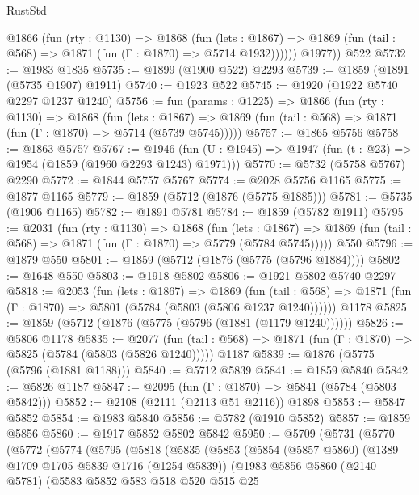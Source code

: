 \begin{lexlean}{RustStd}
\begin{coremodule}
          @1866
            (fun (rty : @1130) =>
            @1868
              (fun (lets : @1867) =>
              @1869 (fun (tail : @568) => @1871 (fun (Γ : @1870) => @5714 @1932))))))
        @1977))
    @522
@5732 := @1983 @1835
@5735 := @1899 (@1900 @522) @2293
@5739 := @1859 (@1891 (@5735 @1907) @1911)
@5740 := @1923 @522
@5745 := @1920 (@1922 @5740 @2297 @1237 @1240)
@5756 := fun (params : @1225) =>
  @1866
    (fun (rty : @1130) =>
    @1868
      (fun (lets : @1867) =>
      @1869 (fun (tail : @568) => @1871 (fun (Γ : @1870) => @5714 (@5739 @5745)))))
@5757 := @1865 @5756
@5758 := @1863 @5757
@5767 := @1946 (fun (U : @1945) => @1947 (fun (t : @23) => @1954 (@1859 (@1960 @2293 @1243) @1971)))
@5770 := @5732 (@5758 @5767) @2290
@5772 := @1844 @5757 @5767
@5774 := @2028 @5756 @1165
@5775 := @1877 @1165
@5779 := @1859 (@5712 (@1876 (@5775 @1885)))
@5781 := @5735 (@1906 @1165)
@5782 := @1891 @5781
@5784 := @1859 (@5782 @1911)
@5795 := @2031
    (fun (rty : @1130) =>
    @1868
      (fun (lets : @1867) =>
      @1869 (fun (tail : @568) => @1871 (fun (Γ : @1870) => @5779 (@5784 @5745)))))
    @550
@5796 := @1879 @550
@5801 := @1859 (@5712 (@1876 (@5775 (@5796 @1884))))
@5802 := @1648 @550
@5803 := @1918 @5802
@5806 := @1921 @5802 @5740 @2297
@5818 := @2053
    (fun (lets : @1867) =>
    @1869
      (fun (tail : @568) => @1871 (fun (Γ : @1870) => @5801 (@5784 (@5803 (@5806 @1237 @1240))))))
    @1178
@5825 := @1859 (@5712 (@1876 (@5775 (@5796 (@1881 (@1179 @1240))))))
@5826 := @5806 @1178
@5835 := @2077
    (fun (tail : @568) => @1871 (fun (Γ : @1870) => @5825 (@5784 (@5803 (@5826 @1240)))))
    @1187
@5839 := @1876 (@5775 (@5796 (@1881 @1188)))
@5840 := @5712 @5839
@5841 := @1859 @5840
@5842 := @5826 @1187
@5847 := @2095 (fun (Γ : @1870) => @5841 (@5784 (@5803 @5842)))
@5852 := @2108 (@2111 (@2113 @51 @2116)) @1898
@5853 := @5847 @5852
@5854 := @1983 @5840
@5856 := @5782 (@1910 @5852)
@5857 := @1859 @5856
@5860 := @1917 @5852 @5802 @5842
@5950 := @5709
    (@5731
      (@5770
        (@5772
          (@5774
            (@5795
              (@5818
                (@5835
                  (@5853
                    (@5854
                      (@5857 @5860)
                      (@1389 @1709 @1705 @5839 @1716 (@1254 @5839))
                      (@1983
                        @5856
                        @5860
                        (@2140 @5781)
                        (@5583
                          @5852
                          @583
                          @518
                          @520
                          @515
                          @25

\end{coremodule}
\end{lexlean}
